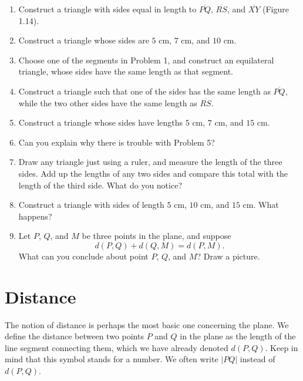\documentclass[12pt]{book} %
\begin{document}
\begin{enumerate}
	\item Construct a triangle with sides equal in length to $\overline{PQ}$, $\overline{RS}$, and $\overline{XY}$ (Figure 1.14).
	
	
	\item Construct a triangle whose sides are $5$ cm, $7$ cm, and $10$ cm.
	
	\item Choose one of the segments in Problem 1, and construct an equilateral triangle, whose sides have the same length as that segment.
	
	\item Construct a triangle such that one of the sides has the same length as $\overline{PQ}$, while the two other sides have the same length as $\overline{RS}$.
	
	\item Construct a triangle whose sides have lengths $5$ cm, $7$ cm, and $15$ cm.
	
	\item Can you explain why there is trouble with Problem 5?
	
	\item Draw any triangle just using a ruler, and measure the length of the three sides. Add up the lengths of any two sides and compare this total with the length of the third side. What do you notice?
	
	\item Construct a triangle with sides of length $5$ cm, $10$ cm, and $15$ cm. What happens?
	
	\item Let $P$, $Q$, and $M$ be three points in the plane, and suppose
	\[
	d(P,Q)+d(Q,M)=d(P,M).
	\]
	What can you conclude about point $P$, $Q$, and $M$? Draw a picture.
\end{enumerate}

\section{Distance}

The notion of distance is perhaps the most basic one concerning the plane. We define the distance between two points $P$ and $Q$ in the plane as the length of the line segment connecting them, which we have already denoted $d(P,Q)$. Keep in mind that this symbol stands for a number. We often write $|PQ|$ instead of $d(P,Q)$.
\end{document}
